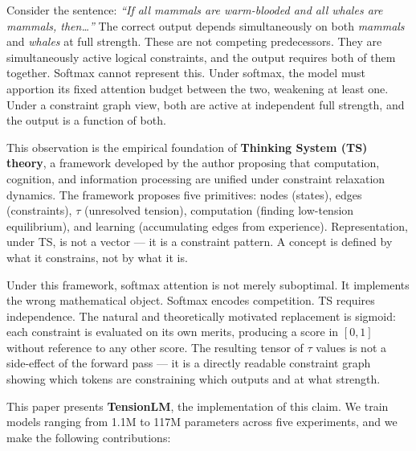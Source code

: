 \documentclass[10pt,a4paper]{article}
\begin{document}
Consider the sentence: \textit{``If all mammals are warm-blooded and all whales are mammals, then\ldots''} The correct output depends simultaneously on both \textit{mammals} and \textit{whales} at full strength. These are not competing predecessors. They are simultaneously active logical constraints, and the output requires both of them together. Softmax cannot represent this. Under softmax, the model must apportion its fixed attention budget between the two, weakening at least one. Under a constraint graph view, both are active at independent full strength, and the output is a function of both.

This observation is the empirical foundation of \textbf{Thinking System (TS) theory}, a framework developed by the author proposing that computation, cognition, and information processing are unified under constraint relaxation dynamics. The framework proposes five primitives: nodes (states), edges (constraints), $\tau$ (unresolved tension), computation (finding low-tension equilibrium), and learning (accumulating edges from experience). Representation, under TS, is not a vector --- it is a constraint pattern. A concept is defined by what it constrains, not by what it is.

Under this framework, softmax attention is not merely suboptimal. It implements the wrong mathematical object. Softmax encodes competition. TS requires independence. The natural and theoretically motivated replacement is sigmoid: each constraint is evaluated on its own merits, producing a score in $[0, 1]$ without reference to any other score. The resulting tensor of $\tau$ values is not a side-effect of the forward pass --- it is a directly readable constraint graph showing which tokens are constraining which outputs and at what strength.

This paper presents \textbf{TensionLM}, the implementation of this claim. We train models ranging from 1.1M to 117M parameters across five experiments, and we make the following contributions:
\end{document}
